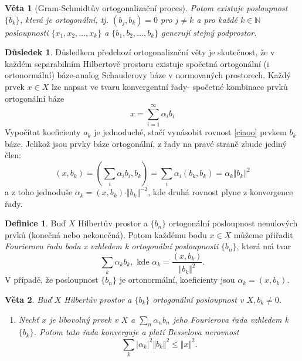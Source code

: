 \documentclass[a4]{report}
\newtheorem{theorem}{Věta}
\theoremstyle{definition}
\newtheorem{definition}{Definice}[section]
\newtheorem{dusledek}{Důsledek}[section]
\begin{document}
{\begin{theorem}[Gram-Schmidtův ortogonalizační proces]
Potom existuje posloupnost $\{b_k\}$, která je ortogonální, tj. $(b_j,b_k)=0$ pro $j\neq k$ a pro každé $k\in \mathbb{N}$ posloupnosti $\{x_1,x_2,\ldots,x_k\}$ a $\{b_1,b_2,\ldots,b_k\}$ generují stejný podprostor.  
	
\end{theorem}

\begin{dusledek}
	Důsledkem předchozí ortogonalizační věty je skutečnost, že v každém separabilním Hilbertově prostoru existuje spočetná ortogonální (i ortonormální) báze-analog Schauderovy báze v normovaných prostorech. Každý prvek $x\in X$ lze napsat ve tvaru konvergentní řady- spočetné kombinace prvků ortogonální báze
	\begin{equation}
	\label{ciaoo}
		x=\sum_{i=1}^{\infty} \alpha_i b_i
	\end{equation}
	Vypočítat koeficienty $a_k$ je jednoduché, stačí vynásobit rovnost \eqref{ciaoo} prvkem $b_k$ báze. Jelikož jsou prvky báze ortogonální, z řady na pravé straně zbude jediný člen:
	\begin{equation}
		(x,b_k)=(\sum_i \alpha_i b_i, b_k)=\sum_i \alpha_i (b_k,b_k)=\alpha_k\Vert b_k\Vert^2
	\end{equation}
	a z toho jednoduše $\alpha_k=(x,b_k)\cdot \Vert b_k\Vert^{-2} $, kde druhá rovnost plyne z konvergence řady.
\end{dusledek}

\begin{definition}
	Buď $X$ Hilbertův prostor a $\{b_n\}$ ortogonální posloupnost nenulových prvků (konečná nebo nekonečná). Potom každému bodu $x\in X$ můžeme přiřadit \textit{Fourierovu řadu bodu x vzhledem k ortogonální posloupnosti }$\{b_n\}$, která má tvar
	\begin{equation}
		\sum_k\alpha_k b_k, \text{  kde      } \alpha_k=\frac{(x,b_k)}{\Vert b_k\Vert^2}.
	\end{equation}
	V případě, že posloupnost $\{b_n\}$ je ortonormální, koeficienty jsou $\alpha_k=(x,b_k).$
\end{definition}

\begin{theorem}
	Buď $X$ Hilbertův prostor a $\{b_k\}$ ortogonální posloupnost v $X, b_k\neq 0$.
	\begin{enumerate}
		\item Nechť $x$ je libovolný prvek v $X$ a $\sum_n \alpha_nb_n$ jeho Fourierova řada vzhledem k $\{b_k \}$. Potom tato řada konverguje a platí \textit{Besselova nerovnost} \begin{equation*}
			\sum_k|\alpha_k|^2\Vert b_k\Vert^2 \leq \Vert x \Vert ^2.
		\end{equation*}
		

\end{enumerate}
\end{theorem}}
\end{document}
